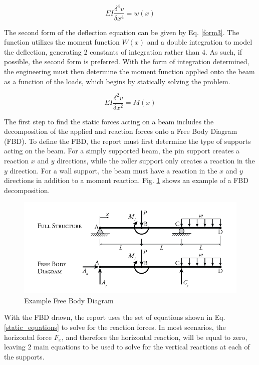 \documentclass[a4paper]{article}
\begin{document}
\begin{equation}
    EI \frac{\delta^4 v}{\delta x^4} = w(x)
\label{form1}
\end{equation}

The second form of the deflection equation can be given by Eq. \ref{form3}. The function utilizes the moment function $W(x)$ and a double integration to model the deflection, generating 2 constants of integration rather than 4. As such, if possible, the second form is preferred. With the form of integration determined, the engineering must then determine the moment function applied onto the beam as a function of the loads, which begins by statically solving the problem.

\begin{equation}
    EI \frac{\delta^2 v}{\delta x^2} = M(x)
\label{form3}
\end{equation}

The first step to find the static forces acting on a beam includes the decomposition of the applied and reaction forces onto a Free Body Diagram (FBD). To define the FBD, the report must first determine the type of supports acting on the beam. For a simply supported beam, the pin support creates a reaction $x$ and $y$ directions, while the roller support only creates a reaction in the $y$ direction. For a wall support, the beam must have a reaction in the $x$ and $y$ directions in addition to a moment reaction. Fig. \ref{FBD_example} shows an example of a FBD decomposition.

\begin{figure}[h]
\includegraphics[width=\textwidth]{figures/FBD_example.jpeg}
\caption{Example Free Body Diagram}
\label{FBD_example}
\end{figure}

With the FBD drawn, the report uses the set of equations shown in Eq. \ref{static_equations} to solve for the reaction forces. In most scenarios, the horizontal force $F_x$, and therefore the horizontal reaction, will be equal to zero, leaving 2 main equations to be used to solve for the vertical reactions at each of the supports. 
\end{document}
